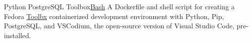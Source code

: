 \datedsubsection{}
{Python PostgreSQL Toolbox}{\href{https://github.com/JacobArchambault?tab=repositories&q=&type=&language=shell&sort=}{Bash}}
{A Dockerfile and shell script for creating a Fedora \href{https://containertoolbx.org/}{Toolbx} containerized development environment with Python, Pip, PostgreSQL, and VSCodium, the open-source version of Visual Studio Code, pre-installed.}
